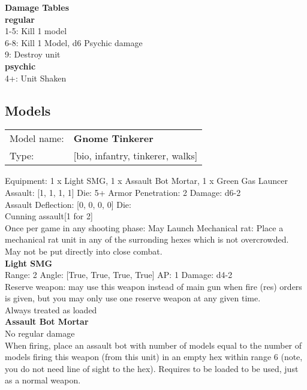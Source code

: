 {\bf Damage Tables} \\
 {\bf regular } \\
1-5: Kill 1 model \\
6-8: Kill 1 Model, d6 Psychic damage \\
9: Destroy unit \\
 {\bf psychic } \\
4+: Unit Shaken \\


\clearpage

\subsection{ Models }

\begin{tabular}{ll}
Model name: & {\bf Gnome Tinkerer } \\
Type: & [bio, infantry, tinkerer, walks] \\
\end{tabular}

Equipment: 1 x Light SMG, 1 x Assault Bot Mortar, 1 x Green Gas Launcer \\

Assault: [1, 1, 1, 1] Die: 5+ Armor Penetration: 2 Damage: d6-2 \\
Assault Deflection: [0, 0, 0, 0] Die: \\
\indent Cunning assault[1 for 2]\\ 
 

Once per game in any shooting phase: May Launch Mechanical rat: Place a mechanical rat unit in any of the surronding hexes which is not overcrowded. May not be put directly into close combat. \\ 


{\bf Light SMG } \\



Range: 2  Angle: [True, True, True, True] AP: 1 Damage: d4-2 \\
Reserve weapon: may use this weapon instead of main gun when fire (res) orders is given, but you may only use one reserve weapon at any given time.\\ 
Always treated as loaded\\ 




{\bf Assault Bot Mortar } \\

No regular damage\\ 
When firing, place an assault bot with number of models equal to the number of models firing this weapon (from this unit) in an empty hex within range 6 (note, you do not need line of sight to the hex). Requires to be loaded to be used, just as a normal weapon.\\ 





